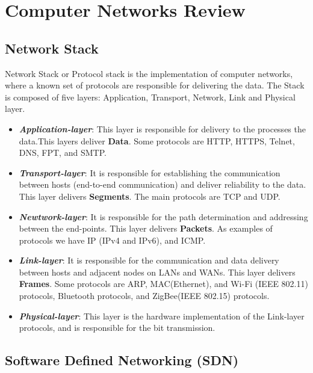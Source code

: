 \chapter{Computer Networks Review}
\label{ap:networks}

\section{Network Stack}

Network Stack\cite{kurose} or Protocol stack is the implementation of computer networks, where a known set of protocols are responsible for delivering the data.  The Stack is composed of five layers: Application, Transport, Network, Link and Physical layer.
\begin{itemize}
    \item \textit{\textbf{Application-layer}}: This layer is responsible for delivery to the processes the data.This layers deliver \textbf{Data}. Some protocols are HTTP, HTTPS, Telnet, DNS, FPT, and SMTP.
    \item \textit{\textbf{Transport-layer}}: It is responsible for establishing the communication between hosts (end-to-end communication) and deliver reliability to the data. This layer delivers \textbf{Segments}. The main protocols are TCP and UDP.
    \item \textit{\textbf{Newtwork-layer}}: It is responsible for the path determination and addressing between the end-points. This layer delivers \textbf{Packets}. As examples of protocols we have IP (IPv4 and IPv6), and ICMP. 
    \item \textit{\textbf{Link-layer}}: It is responsible for the communication and data delivery between hosts and adjacent nodes on LANs and WANs. This layer delivers \textbf{Frames}. Some protocols are ARP, MAC(Ethernet), and Wi-Fi (IEEE 802.11) protocols, Bluetooth protocols, and ZigBee(IEEE 802.15) protocols. 
    \item \textit{\textbf{Physical-layer}}: This layer is the hardware implementation of the Link-layer protocols, and is responsible for the bit transmission. 
\end{itemize}

\section{Software Defined Networking (SDN)}

